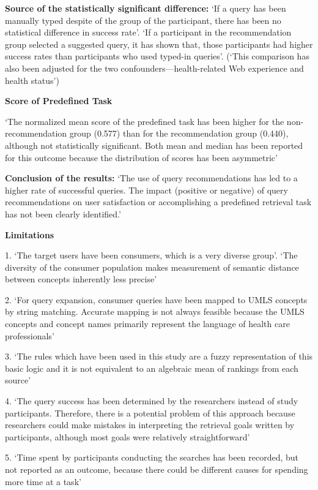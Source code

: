 \documentclass[]{article}
\begin{document}
\textbf{Source of the statistically significant difference:} ‘If a query has been manually typed despite of the group of the participant, there has been no statistical difference in success rate’. ‘If a participant in the recommendation group selected a suggested query, it has shown that, those participants had higher success rates than participants who used typed-in queries’. (‘This comparison has also been adjusted for the two confounders—health-related Web experience and health status’)

\textbf{Score of Predefined Task}

‘The normalized mean score of the predefined task has been higher for the non-recommendation group (0.577) than for the recommendation group (0.440), although not statistically significant. Both mean and median has been reported for this outcome because the distribution of scores has been asymmetric’

\textbf{Conclusion of the results:} ‘The use of query recommendations has led to a higher rate of successful queries. The impact (positive or negative) of query recommendations on user satisfaction or accomplishing a predefined retrieval task has not been clearly identified.’

\textbf{Limitations}

1.	‘The target users have been consumers, which is a very diverse group’. ‘The diversity of the consumer population makes measurement of semantic distance between concepts inherently less precise’

2.	‘For query expansion, consumer queries have been mapped to UMLS concepts by string matching. Accurate mapping is not always feasible because the UMLS concepts and concept names primarily represent the language of health care professionals’

3.	‘The rules which have been used in this study are a fuzzy representation of this basic logic and it is not equivalent to an algebraic mean of rankings from each source’

4.	‘The query success has been determined by the researchers instead of study participants. Therefore, there is a potential problem of this approach because researchers could make mistakes in interpreting the retrieval goals written by participants, although most goals were relatively straightforward’

5.	‘Time spent by participants conducting the searches has been recorded, but not reported as an outcome, because there could be different causes for spending more time at a task’
\end{document}
